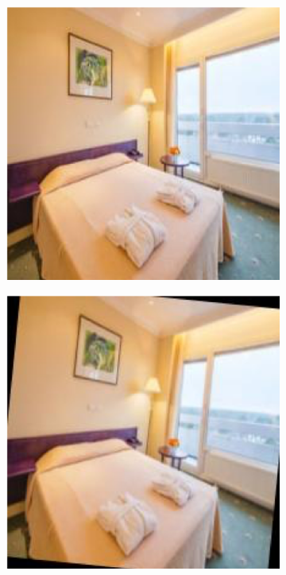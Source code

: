 \begin{figure}
\centering
   \begin{subfigure}[b]{.19\columnwidth}
        \centering
        \includegraphics[width=.98\columnwidth]{figures/chapter4/data_augmentation/1.png}
        \caption{}
    \end{subfigure}
   \begin{subfigure}[b]{.19\columnwidth}
        \centering
        \includegraphics[width=.98\columnwidth]{figures/chapter4/data_augmentation/2.png}

\end{subfigure}
\end{figure}
